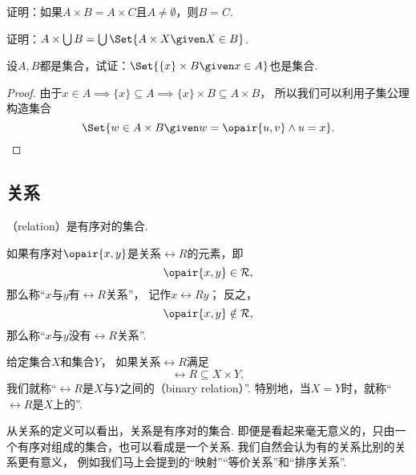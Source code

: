 \begin{example}
证明：如果\(A \times B = A \times C\)且\(A \neq \emptyset\)，则\(B = C\).
\end{example}

\begin{example}
证明：\(A \times \bigcup B = \bigcup\Set{ A \times X \given X \in B }\).
\end{example}

\begin{example}
设\(A,B\)都是集合，试证：\(\Set{ \{x\} \times B \given x \in A }\)也是集合.
\begin{proof}
由于\(x \in A \implies \{x\} \subseteq A \implies \{x\} \times B \subseteq A \times B\)，
所以我们可以利用子集公理构造集合\begin{equation*}
	\Set{ w \in A \times B \given w = \opair{u,v} \land u = x }.
	\qedhere
\end{equation*}
\end{proof}
\end{example}

\subsection{关系}
\begin{definition}
（relation）是有序对的集合.
\end{definition}

如果有序对\(\opair{x,y}\)是关系\(\rel{R}\)的元素，即\begin{equation*}
	\opair{x,y} \in \rel{R},
\end{equation*}
那么称“\(x\)与\(y\)有\(\rel{R}\)关系”，
记作\(x\rel{R}y\)；
反之，\begin{equation*}
	\opair{x,y} \notin \rel{R},
\end{equation*}
那么称“\(x\)与\(y\)没有\(\rel{R}\)关系”.

给定集合\(X\)和集合\(Y\)，
如果关系\(\rel{R}\)满足\begin{equation*}
	\rel{R} \subseteq X \times Y,
\end{equation*}
我们就称“\(\rel{R}\)是\(X\)与\(Y\)之间的（binary relation）”.
特别地，当\(X = Y\)时，就称“\(\rel{R}\)是\(X\)上的”.

从关系的定义可以看出，关系是有序对的集合.
即便是看起来毫无意义的，只由一个有序对组成的集合，也可以看成是一个关系.
我们自然会认为有的关系比别的关系更有意义，
例如我们马上会提到的“映射”“等价关系”和“排序关系”.

